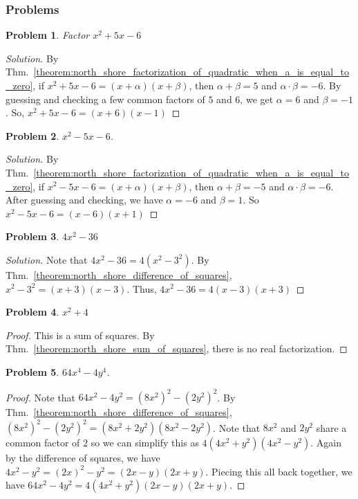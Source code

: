\documentclass[oneside]{book}
\theoremstyle{mystyle}
\newtheorem{problem}{Problem}[section]
\begin{document}
\subsubsection{Problems}
\begin{problem}
Factor $x^2 + 5x - 6$
\end{problem}
\begin{proof}[Solution]
By Thm.~\ref{theorem:north_shore_factorization_of_quadratic_when_a_is_equal_to_zero}, if $x^2+5x-6 = (x+\alpha)(x+\beta)$, then $\alpha+\beta = 5$ and $\alpha\cdot \beta = -6$. By guessing and checking a few common factors of $5$ and $6$, we get $\alpha = 6$ and $\beta = -1$. So, $x^2+5x-6 = (x+6)(x-1)$
\end{proof}
\begin{problem}
$x^2 - 5x - 6$.
\end{problem}
\begin{proof}[Solution]
By Thm.~\ref{theorem:north_shore_factorization_of_quadratic_when_a_is_equal_to_zero}, if $x^2-5x-6=(x+\alpha)(x+\beta)$, then $\alpha+\beta = -5$ and $\alpha\cdot \beta = -6$. After guessing and checking, we have $\alpha = -6$ and $\beta = 1$. So $x^2-5x-6 = (x-6)(x+1)$
\end{proof}
\begin{problem}
$4x^2 - 36$
\end{problem}
\begin{proof}[Solution]
Note that $4x^2-36 = 4(x^2-3^2)$. By Thm.~\ref{theorem:north_shore_difference_of_squares}, $x^2-3^2= (x+3)(x-3)$. Thus, $4x^2-36 = 4(x-3)(x+3)$
\end{proof}
\begin{problem}
$x^2 + 4$
\end{problem}
\begin{proof}
This is a sum of squares. By Thm.~\ref{theorem:north_shore_sum_of_squares}, there is no real factorization.
\end{proof}
\begin{problem}
$64x^4 - 4y^4$.
\end{problem}
\begin{proof}
Note that $64x^2 - 4y^2 = (8x^2)^2 - (2y^2)^2$. By Thm.~\ref{theorem:north_shore_difference_of_squares}, $(8x^2)^2 - (2y^2)^2 = (8x^2+2y^2)(8x^2 - 2y^2)$. Note that $8x^2$ and $2y^2$ share a common factor of $2$ so we can simplify this as $ 4(4x^2 +y^2)(4x^2-y^2)$. Again by the difference of squares, we have $4x^2 - y^2 = (2x)^2 - y^2 = (2x-y)(2x+y)$. Piecing this all back together, we have $64x^2 - 4y^2 = 4(4x^2 + y^2)(2x-y)(2x+y)$.
\end{proof}
\end{document}
